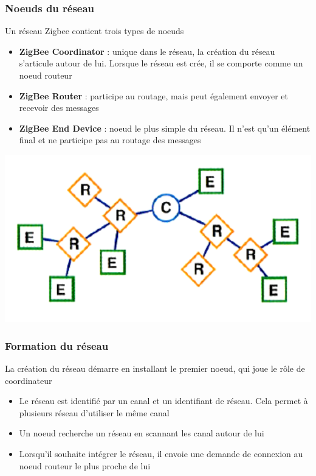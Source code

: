 \documentclass{beamer}
\begin{document}
  \begin{frame}
   \frametitle{Noeuds du réseau}
   \begin{block}{Un réseau Zigbee contient trois types de noeuds}
    \begin{itemize}
     \item \textbf{ZigBee Coordinator} : unique dans le réseau, la création du réseau s'articule autour de lui. Lorsque le réseau est crée, il se comporte comme un noeud routeur
     \item \textbf{ZigBee Router} : participe au routage, mais peut également envoyer et recevoir des messages
     \item \textbf{ZigBee End Device} : noeud le plus simple du réseau. Il n'est qu'un élément final et ne participe pas au routage des messages
    \end{itemize}
      \begin{center}
      \includegraphics[scale=0.3]{Reseau.png}
      \end{center} 
   \end{block}
  \end{frame}
  
  \begin{frame}
   \frametitle{Formation du réseau}
   \begin{block}{La création du réseau démarre en installant le premier noeud, qui joue le rôle de coordinateur}
    \begin{itemize}
     \item Le réseau est identifié par un canal et un identifiant de réseau. Cela permet à plusieurs réseau d'utiliser le même canal
     \item Un noeud recherche un réseau en scannant les canal autour de lui
     \item Lorsqu'il souhaite intégrer le réseau, il envoie une demande de connexion au noeud routeur le plus proche de lui 
    \end{itemize}
   \end{block}
  \end{frame}
\end{document}
